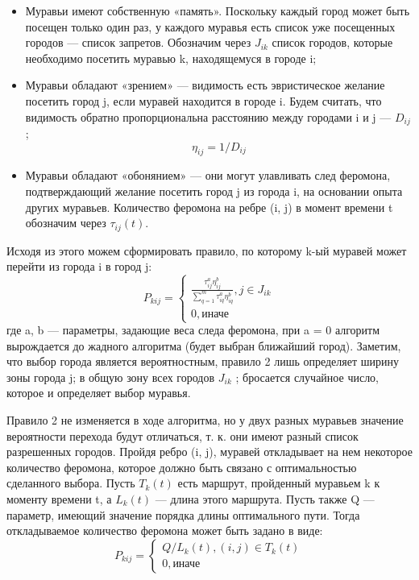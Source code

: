 \begin{itemize}
	\item Муравьи имеют собственную «память». Поскольку каждый город может быть посещен
	только один раз, у каждого муравья есть список уже посещенных городов — список
	запретов. Обозначим через $J_{ik}$ список городов, которые необходимо посетить муравью k, находящемуся в городе i;
	\item Муравьи обладают «зрением» — видимость есть эвристическое желание посетить город j, если муравей находится в городе i. Будем считать, что видимость обратно пропорциональна расстоянию между городами i и j — $D_{ij}$;
	\begin{equation}
		\eta_{ij} = 1 / D_{ij}
	\end{equation}
	\item Муравьи обладают «обонянием» — они могут улавливать след феромона, подтверждающий желание посетить город j из города i, на основании опыта других муравьев. Количество феромона на ребре (i, j) в момент времени t обозначим через $\tau_{ij}(t)$.
\end{itemize}

Исходя из этого можем сформировать правило, по которому k-ый муравей может перейти из города i в город j:
 \begin{equation}
 P_{kij} = \begin{cases}
 \frac{\tau_{ij}^a\eta_{ij}^b}{\sum_{q=1}^m \tau^a_{iq}\eta^b_{iq}}, j \in J_{ik} \\
 0, \textrm{иначе}
 \end{cases}
 \end{equation}
где a, b — параметры, задающие веса следа феромона, при a = 0 алгоритм вырождается до жадного алгоритма (будет выбран ближайший город). Заметим, что выбор города
является вероятностным, правило 2 лишь определяет ширину зоны города j; в общую зону
всех городов $J_{ik}$ ; бросается случайное число, которое и определяет выбор муравья. 

Правило 2 не изменяется в ходе алгоритма, но у двух разных муравьев значение вероятности перехода будут отличаться, т. к. они имеют разный список разрешенных городов.
Пройдя ребро (i, j), муравей откладывает на нем некоторое количество феромона, которое должно быть связано с оптимальностью сделанного выбора. Пусть $T_{k}(t)$ есть маршрут,
пройденный муравьем k к моменту времени t, а $L_{k}(t)$ — длина этого маршрута. Пусть также
Q — параметр, имеющий значение порядка длины оптимального пути. Тогда откладываемое
количество феромона может быть задано в виде:
\begin{equation}
	P_{kij} = \begin{cases}
	Q/L_{k}(t), (i,j) \in T_{k}(t)\\
	0, \textrm{иначе}
	\end{cases}	
\end{equation}

